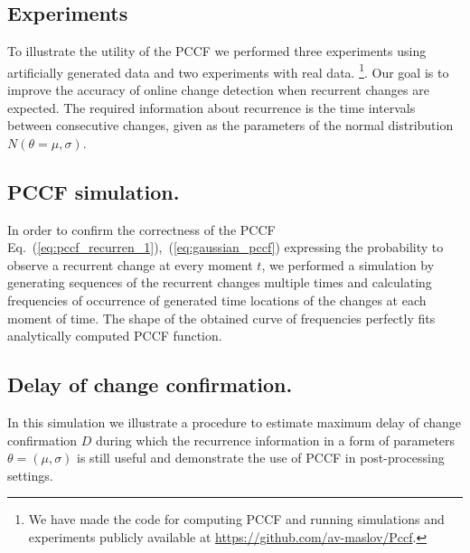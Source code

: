 \subsection{Experiments}
\label{subsec:experiments}
To illustrate the utility of the PCCF we performed three experiments using artificially generated data and two experiments with real data.
\footnote{We have made the code for computing PCCF and running simulations and experiments publicly available at \url{https://github.com/av-maslov/Pccf}.}.
Our goal is to improve the accuracy of online change detection when recurrent changes are expected.
The required information about recurrence is the time intervals between consecutive changes, given as the parameters of the normal distribution $N(\theta = \mu, \sigma)$.

\subsection{PCCF simulation.}
In order to confirm the correctness of the PCCF Eq.~(\ref{eq:pccf_recurren_1}),~(\ref{eq:gaussian_pccf}) expressing the probability to observe a recurrent change at every moment $t$, we performed a simulation by generating sequences of the recurrent changes multiple times and calculating frequencies of occurrence of generated time locations of the changes at each moment of time.
The shape of the obtained curve of frequencies perfectly fits analytically computed PCCF function.

\subsection{Delay of change confirmation.}
In this simulation we illustrate a procedure to estimate maximum delay of change confirmation $D$ during which the recurrence information in a form of parameters $\theta = (\mu, \sigma)$ is still useful and demonstrate the use of PCCF in post-processing settings.

